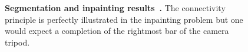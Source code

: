 \begin{figure}
\begin{tabular}{ccc}
\end{tabular}
\caption{\textbf{Segmentation and inpainting results~\cite{nieuwenhuis14efficient}.} The connectivity principle is perfectly illustrated in the inpainting problem but one would expect a completion of the rightmost bar of the camera tripod. }
\label{ch4:fig:nieuweinhuis-results}
\end{figure}



%
%
%
%
%
%
%
%
%
%
%
%
%
%
%
